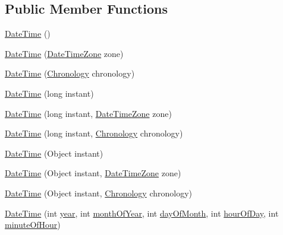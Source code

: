 \subsection*{Public Member Functions}
\begin{DoxyCompactItemize}
\item 
\hyperlink{classorg_1_1joda_1_1time_1_1_date_time_adb8e68c57da37d818ba225a3e0e07269}{Date\-Time} ()
\item 
\hyperlink{classorg_1_1joda_1_1time_1_1_date_time_a438089ebc9826a65c6c8a43be501c0fc}{Date\-Time} (\hyperlink{classorg_1_1joda_1_1time_1_1_date_time_zone}{Date\-Time\-Zone} zone)
\item 
\hyperlink{classorg_1_1joda_1_1time_1_1_date_time_aa3a20388ee5310114966c03d5289eefc}{Date\-Time} (\hyperlink{classorg_1_1joda_1_1time_1_1_chronology}{Chronology} chronology)
\item 
\hyperlink{classorg_1_1joda_1_1time_1_1_date_time_a9a2b53619fa44ebc4499699ec0f65fe0}{Date\-Time} (long instant)
\item 
\hyperlink{classorg_1_1joda_1_1time_1_1_date_time_a67bb016101d3ca0f056473bc58ce2469}{Date\-Time} (long instant, \hyperlink{classorg_1_1joda_1_1time_1_1_date_time_zone}{Date\-Time\-Zone} zone)
\item 
\hyperlink{classorg_1_1joda_1_1time_1_1_date_time_aebd41e4074eed4795f20c596ca5b3b6d}{Date\-Time} (long instant, \hyperlink{classorg_1_1joda_1_1time_1_1_chronology}{Chronology} chronology)
\item 
\hyperlink{classorg_1_1joda_1_1time_1_1_date_time_a81749bb622a9aecb585bae71329a1805}{Date\-Time} (Object instant)
\item 
\hyperlink{classorg_1_1joda_1_1time_1_1_date_time_a5a34044d3d212dc21742870e8c1c714b}{Date\-Time} (Object instant, \hyperlink{classorg_1_1joda_1_1time_1_1_date_time_zone}{Date\-Time\-Zone} zone)
\item 
\hyperlink{classorg_1_1joda_1_1time_1_1_date_time_a81247a394e65ab60a10bc789319596f8}{Date\-Time} (Object instant, \hyperlink{classorg_1_1joda_1_1time_1_1_chronology}{Chronology} chronology)
\item 
\hyperlink{classorg_1_1joda_1_1time_1_1_date_time_a4912d721aeb6f1f5b61aa68a88a2954b}{Date\-Time} (int \hyperlink{classorg_1_1joda_1_1time_1_1_date_time_a2fad630c40bee720a815fb4e2a06f133}{year}, int \hyperlink{classorg_1_1joda_1_1time_1_1_date_time_a9119fa14bbe721475778ba261337aa0e}{month\-Of\-Year}, int \hyperlink{classorg_1_1joda_1_1time_1_1_date_time_ae2edf04c8cc742fdfcd838acf53f8751}{day\-Of\-Month}, int \hyperlink{classorg_1_1joda_1_1time_1_1_date_time_ad4d63b2e220315cf5eb57d3960f65ba5}{hour\-Of\-Day}, int \hyperlink{classorg_1_1joda_1_1time_1_1_date_time_ab9fa72f78065c0a7abb9819505d66ee6}{minute\-Of\-Hour})

\end{DoxyCompactItemize}
